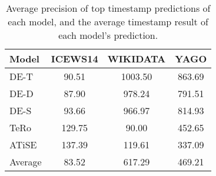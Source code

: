 \begin{table*}[htb]
\centering
\begin{minipage}{0.95\textwidth}
\centering
\caption{Average precision of top timestamp predictions of each model, and the average timestamp result of each model's prediction.}
\vspace{-3mm}

\begin{tabular}{l|ccc}\hline
Model & ICEWS14 & WIKIDATA & YAGO \\ \hline
DE-T & 90.51 & 1003.50 & 863.69 \\ 
DE-D & 87.90 & 978.24 & 791.51 \\ 
DE-S & 93.66 & 966.97 & 814.93 \\ 
TeRo & 129.75 & 90.00 & 452.65 \\ 
ATiSE & 137.39 & 119.61 & 337.09 \\ \hline 
Average & 83.52 & 617.29 & 469.21 \\ \hline 

\end{tabular}

\label{fig:timestamp_voting_table}
\end{minipage}
\end{table*}

